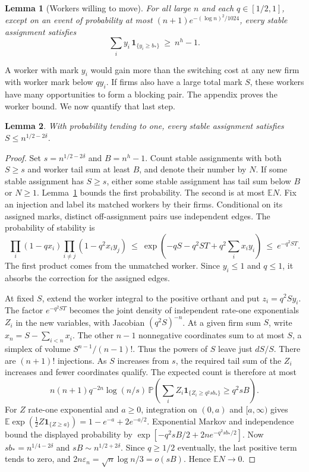 \documentclass[11pt]{article}
\newtheorem{lemma}{Lemma}
\newcommand{\E}{\mathbb E}
\newcommand{\Prob}{\mathbb P}
\newcommand{\ind}{\mathbf 1}
\newcommand{\eps}{\varepsilon_n}
\begin{document}
\begin{lemma}[Workers willing to move]\label{lem:tail}
For all large $n$ and each $q\in[1/2,1]$, except on an event of probability
at most $(n+1)e^{-(\log n)^2/1024}$, every stable assignment satisfies
\[
    \sum_i y_i\,\ind_{\{y_i\ge b_*\}}\ \ge\ n^h-1 .
\]
\end{lemma}

A worker with mark $y_i$ would gain more than the switching cost at any
new firm with worker mark below $q y_i$. If firms also have a large total
mark $S$, these workers have many opportunities to form a blocking pair.
The appendix proves the worker bound. We now quantify that last step.

\begin{lemma}\label{lem:firm}
With probability tending to one, every stable assignment satisfies
$S\le n^{1/2-2\delta}$.
\end{lemma}

\begin{proof}
Set $s=n^{1/2-2\delta}$ and $B=n^h-1$. Count stable assignments with both
$S\ge s$ and worker tail sum at least $B$, and denote their number by $N$.
If some stable assignment has $S\ge s$, either some stable assignment has
tail sum below $B$ or $N\ge1$. Lemma~\ref{lem:tail} bounds the first
probability. The second is at most $\E N$.
Fix an injection and label its matched workers by their firms. Conditional
on its assigned marks, distinct off-assignment pairs use independent
edges. The probability of stability is
\[
 \prod_i(1-qx_i)\prod_{i\ne j}(1-q^2x_i y_j)
 \ \le\ \exp\!\left(-qS-q^2ST+q^2\sum_i x_i y_i\right)
 \ \le\ e^{-q^2ST}.
\]
The first product comes from the unmatched worker. Since $y_i\le1$ and
$q\le1$, it absorbs the correction for the assigned edges.

At fixed $S$, extend the worker integral to the positive orthant and put
$z_i=q^2 S y_i$. The factor $e^{-q^2ST}$ becomes the joint density of
independent rate-one exponentials $Z_i$ in the new variables, with
Jacobian $(q^2 S)^{-n}$. At a given firm sum $S$, write
$x_n=S-\sum_{i<n}x_i$. The other $n-1$ nonnegative coordinates
sum to at most $S$, a simplex of volume $S^{n-1}/(n-1)!$.
Thus the powers of $S$ leave just $dS/S$. There are $(n+1)!$ injections.
As $S$ increases from $s$, the required tail sum of the $Z_i$ increases
and fewer coordinates qualify. The expected count is therefore at most
\[
 n(n+1)q^{-2n}\log(n/s)\,
 \Prob\!\left(\sum_i Z_i\ind_{\{Z_i\ge q^2s b_*\}}\ge q^2sB\right).
\]
For $Z$ rate-one exponential and $a\ge0$, integration on $(0,a)$
and $[a,\infty)$ gives
$\E\exp(\tfrac12 Z\ind_{\{Z\ge a\}})=1-e^{-a}+2e^{-a/2}$.
Exponential Markov and independence bound the displayed probability by
$\exp[-q^2sB/2+2n e^{-q^2s b_*/2}]$. Now $s b_*=n^{1/4-2\delta}$
and $sB\sim n^{1/2+2\delta}$. Since $q\ge1/2$ eventually, the last
positive term tends to zero, and $2n\eps=\sqrt n\log n/3=o(sB)$.
Hence $\E N\to0$.
\end{proof}
\end{document}
